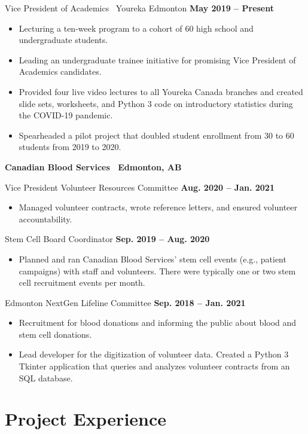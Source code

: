 \documentclass{article}
\begin{document}
Vice President of Academics \textbar\ Youreka Edmonton \hfill \textbf{May 2019 -- Present}
\begin{itemize}
    \item Lecturing a ten-week program to a cohort of 60 high school and undergraduate students.
    \item Leading an undergraduate trainee initiative for promising Vice President of Academics candidates.
    \item Provided four live video lectures to all Youreka Canada branches and created slide sets, worksheets, and Python 3 code on introductory statistics during the COVID-19 pandemic.
    \item Spearheaded a pilot project that doubled student enrollment from 30 to 60 students from 2019 to 2020.
\end{itemize}

\textbf{Canadian Blood Services \textbar\ Edmonton, AB}

Vice President Volunteer Resources Committee \hfill \textbf{Aug. 2020 -- Jan. 2021}
\begin{itemize}
    \item Managed volunteer contracts, wrote reference letters, and ensured volunteer accountability.
\end{itemize}

Stem Cell Board Coordinator \hfill \textbf{Sep. 2019 -- Aug. 2020}
\begin{itemize}
    \item Planned and ran Canadian Blood Services' stem cell events (e.g., patient campaigns) with staff and volunteers. There were typically one or two stem cell recruitment events per month.
\end{itemize}

Edmonton NextGen Lifeline Committee \hfill \textbf{Sep. 2018 -- Jan. 2021}
\begin{itemize}
    \item Recruitment for blood donations and informing the public about blood and stem cell donations.
    \item Lead developer for the digitization of volunteer data. Created a Python 3 Tkinter application that queries and analyzes volunteer contracts from an SQL database.
\end{itemize}



\section*{\textcolor{my_colour}{Project Experience}}
\vspace{-.25em} \hrulefill \vspace{.75em}
\end{document}
